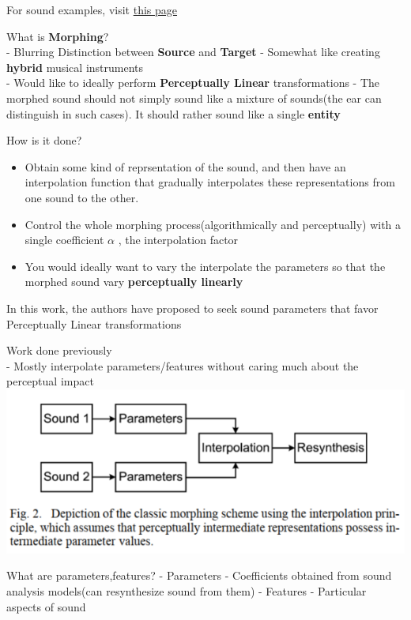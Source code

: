 \documentclass[11pt]{article}
\makeatletter
\def\maxwidth{\ifdim\Gin@nat@width>\linewidth\linewidth
    \else\Gin@nat@width\fi}
\let\Oldincludegraphics\includegraphics
\renewcommand{\includegraphics}[1]{\Oldincludegraphics[width=.8\maxwidth]{#1}}
\providecommand{\tightlist}{%
      \setlength{\itemsep}{0pt}\setlength{\parskip}{0pt}}
\makeatother
\begin{document}
For sound examples, visit
\href{http://recherche.ircam.fr/anasyn/caetano/overview.html}{this page}

    What is \textbf{Morphing}?\\
- Blurring Distinction between \textbf{Source} and \textbf{Target} -
Somewhat like creating \textbf{hybrid} musical instruments\\
- Would like to ideally perform \textbf{Perceptually Linear}
transformations - The morphed sound should not simply sound like a
mixture of sounds(the ear can distinguish in such cases). It should
rather sound like a single \textbf{entity}

How is it done?

\begin{itemize}
\tightlist
\item
  Obtain some kind of reprsentation of the sound, and then have an
  interpolation function that gradually interpolates these
  representations from one sound to the other.\\
\item
  Control the whole morphing process(algorithmically and perceptually)
  with a single coefficient \(\alpha\) , the interpolation factor
\item
  You would ideally want to vary the interpolate the parameters so that
  the morphed sound vary \textbf{perceptually linearly}
\end{itemize}

In this work, the authors have proposed to seek sound parameters that
favor Perceptually Linear transformations

    Work done previously\\
- Mostly interpolate parameters/features without caring much about the
perceptual impact \includegraphics{fig_9.PNG}

What are parameters,features? - Parameters - Coefficients obtained from
sound analysis models(can resynthesize sound from them) - Features -
Particular aspects of sound
\end{document}
